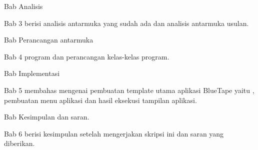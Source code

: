 \noindent Bab Analisis 

\noindent Bab 3 berisi analisis antarmuka yang sudah ada dan analisis antarmuka usulan.


\noindent Bab Perancangan antarmuka

\noindent Bab 4 program dan perancangan kelas-kelas program.


\noindent Bab Implementasi 

\noindent Bab 5 membahas mengenai pembuatan template utama aplikasi BlueTape yaitu , pembuatan menu aplikasi dan hasil eksekusi tampilan aplikasi. 


\noindent Bab Kesimpulan dan saran.

\noindent Bab 6 berisi kesimpulan setelah mengerjakan skripsi ini dan saran yang diberikan.
